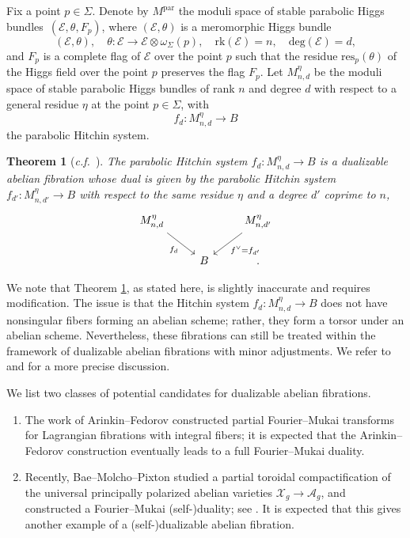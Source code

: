 \documentclass[11pt]{amsart}
\theoremstyle{plain}
\newtheorem{thm}{Theorem}[section]
\theoremstyle{definition}
\theoremstyle{remark}
\newcommand{\CA}{{\mathcal A}}
\newcommand{\CE}{{\mathcal E}}
\newcommand{\CX}{{\mathcal X}}
\begin{document}
Fix a point $p\in \Sigma$. Denote by ${M}^{\mathrm{par}}$ the moduli space of stable parabolic Higgs bundles~$(\CE, \theta, F_p)$, where $(\CE,\theta)$ is a meromorphic Higgs bundle
\[
(\CE, \theta), \quad \theta: \CE \to \CE\otimes \omega_\Sigma(p), \quad \mathrm{rk}(\CE) = n, \quad \mathrm{deg}(\CE) = d,
\]
and $F_p$ is a complete flag of $\CE$ over the point $p$ such that the residue $\mathrm{res}_p(\theta)$ of the Higgs field over the point $p$ preserves the flag $F_p$. Let $M^\eta_{n,d}$ be the moduli space of stable parabolic Higgs bundles of rank $n$ and degree $d$ with respect to a general residue $\eta$ at the point $p\in \Sigma$, with 
\[
f_d: M^\eta_{n,d} \to B
\]
the parabolic Hitchin system.



\begin{thm}[\emph{c.f.}~\cite{MSY2}]\label{thm2.9}
The parabolic Hitchin system $f_{d}: M^\eta_{n,d} \to B$ is a dualizable abelian fibration whose dual is given by the parabolic Hitchin system $f_{d'}: M^\eta_{n,d'} \to B$ with respect to the same residue $\eta$ and a degree $d'$ coprime to $n$,
\[
\begin{tikzcd}
M^\eta_{n,d} \arrow[dr, "f_d"'] & & M^\eta_{n,d'} \arrow[dl, "f^\vee = f_{d'}"] \\
& B &.
\end{tikzcd}
\]
\end{thm}

We note that Theorem \ref{thm2.9}, as stated here, is slightly inaccurate and requires modification. The issue is that the Hitchin system $f_d: M^\eta_{n,d} \to B$ does not have nonsingular fibers forming an abelian scheme; rather, they form a torsor under an abelian scheme. Nevertheless, these fibrations can still be treated within the framework of dualizable abelian fibrations with minor adjustments. We refer to \cite[Section 4]{MSY} and \cite[Section 2]{MSY2} for a more precise discussion.




\medskip

 We list two classes of potential candidates for dualizable abelian fibrations.

\begin{enumerate}
    \item[(a)] The work of Arinkin--Fedorov \cite{AF} constructed partial Fourier--Mukai transforms for Lagrangian fibrations with integral fibers; it is expected that the Arinkin--Fedorov construction eventually leads to a full Fourier--Mukai duality.
    \item[(b)]Recently, Bae--Molcho--Pixton \cite{BMP} studied a partial toroidal compactification of the universal principally polarized abelian varieties $\CX_g \to \CA_g$, and constructed a Fourier--Mukai (self-)duality; see \cite[Theorem 1.5]{BMP}. It is expected that this gives another example of a (self-)dualizable abelian fibration.
\end{enumerate}
\end{document}
